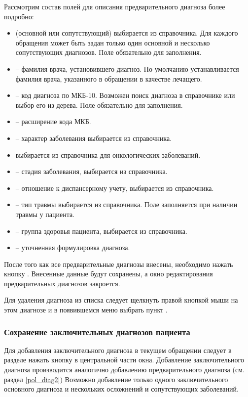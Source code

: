 Рассмотрим состав полей для описания предварительного диагноза более подробно:
\begin{itemize}
 \item {} (основной или сопутствующий) выбирается из справочника. Для каждого обращения может быть задан только один основной и несколько сопутствующих диагнозов. Поле обязательно для заполнения.
 \item {} – фамилия врача, установившего диагноз. По умолчанию устанавливается фамилия врача, указанного в обращении в качестве лечащего.
 \item {} – код диагноза по МКБ-10. Возможен поиск диагноза в справочнике или выбор его из дерева. Поле обязательно для заполнения.
 \item {} – расширение кода МКБ.
 \item {} – характер заболевания выбирается из справочника.
 \item {} выбирается из справочника для онкологических заболеваний.
 \item {} – стадия заболевания, выбирается из справочника.
 \item {} – отношение к диспансерному учету, выбирается из справочника.
 \item {} – тип травмы выбирается из справочника. Поле заполняется при наличии травмы у пациента.
 \item {} – группа здоровья пациента, выбирается из справочника.
 \item {} – уточненная формулировка диагноза.
\end{itemize}
  
После того как все предварительные диагнозы внесены, необходимо нажать кнопку . Внесенные данные будут сохранены, а окно редактирования предварительных диагнозов закроется.

Для удаления диагноза из списка следует щелкнуть правой кнопкой мыши на этом диагнозе и в появившемся меню выбрать пункт .

\subsubsection{Сохранение заключительных диагнозов пациента}

Для добавления заключительного диагноза в текущем обращении следует в разделе  нажать кнопку  в центральной части окна. Добавление заключительного диагноза производится аналогично добавлению предварительного диагноза (см. раздел \ref{pol_diag2}) Возможно добавление только одного заключительного основного диагноза и нескольких осложнений и сопутствующих заболеваний.

